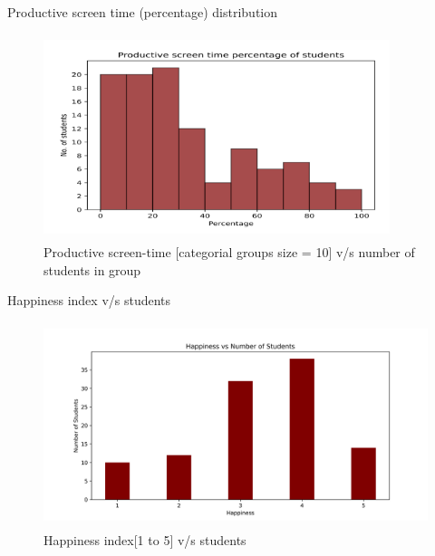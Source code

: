\documentclass{beamer}
\begin{document}
\begin{frame}
\begin{block}{Productive screen time (percentage) distribution}
\begin{figure}[hbtp]
\caption{Productive screen-time [categorial groups size = 10] v/s number of students in group}
\centering
\includegraphics[width = 0.9\textwidth, height=6cm]{productive_screen_time.png}
\end{figure}
\end{block}
\end{frame}

\begin{frame}
\begin{block}{Happiness index v/s students}
\begin{figure}[hbtp]
\caption{Happiness index[1 to 5] v/s students}
\centering
\includegraphics[width=1.0\textwidth, height = 6cm]{Happiness_vs_number_of_students.png}
\end{figure}
\end{block}
\end{frame}
\end{document}
